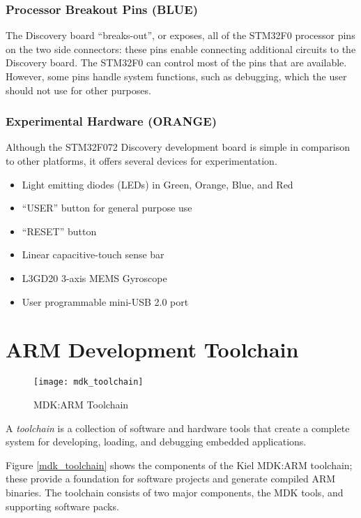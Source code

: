 \documentclass[11pt,fleqn]{book} %
\begin{document}
\subsubsection*{Processor Breakout Pins ({\color{blue!90!black}BLUE})}	

The Discovery board ``breaks-out'', or exposes, all of the STM32F0 processor pins on the two side connectors: these pins enable connecting additional circuits to the Discovery board. The STM32F0 can control most of the pins that are available. However, some pins handle system functions, such as debugging, which the user should not use for other purposes. 
\newpage
\subsubsection*{Experimental Hardware  ({\color{orange!90!black}ORANGE})}
Although the STM32F072 Discovery development board is simple in comparison to other platforms, it offers several devices for experimentation.

\begin{itemize}
	\item Light emitting diodes (LEDs) in Green, Orange, Blue, and Red
	\item ``USER'' button for general purpose use
	\item ``RESET'' button
	\item Linear capacitive-touch sense bar
	\item L3GD20 3-axis MEMS Gyroscope
	\item User programmable mini-USB 2.0 port
\end{itemize}
	

\section{ARM Development Toolchain}

\begin{figure}[b!]
	\centering\texttt{[image: mdk\_toolchain]}
	\caption{MDK:ARM Toolchain}
	\label{mdk_toolchain}
\end{figure}

A \textit{toolchain} is a collection of software and hardware tools that create a complete system for developing, loading, and debugging embedded applications. 

Figure \vref{mdk_toolchain} shows the components of the Kiel MDK:ARM toolchain; these provide a foundation for software projects and generate compiled ARM binaries. 
The toolchain consists of two major components, the MDK tools, and supporting software packs.
\end{document}
